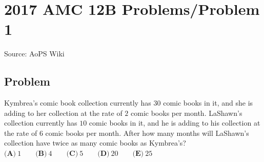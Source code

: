 \documentclass[12pt]{article}
\begin{document}
\section*{{2017 AMC 12B Problems/Problem 1}}
Source: AoPS Wiki

\subsection*{Problem}
Kymbrea's comic book collection currently has $30$ comic books in it, and she is adding to her collection at the rate of $2$ comic books per month. LaShawn's collection currently has $10$ comic books in it, and he is adding to his collection at the rate of $6$ comic books per month. After how many months will LaShawn's collection have twice as many comic books as Kymbrea's? $\textbf{(A)}\ 1\qquad\textbf{(B)}\ 4\qquad\textbf{(C)}\ 5\qquad\textbf{(D)}\ 20\qquad\textbf{(E)}\ 25$
\end{document}
